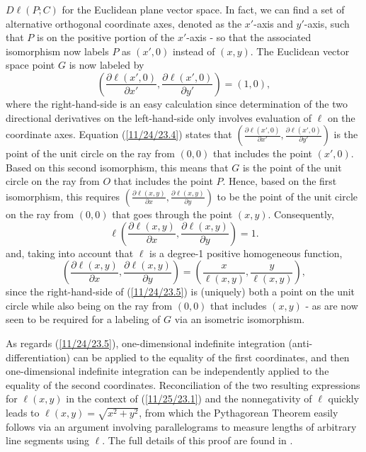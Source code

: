 \documentclass{amsart}
\numberwithin{equation}{section}
\theoremstyle{definition}
\numberwithin{theorem}{section}
\begin{document}
$D\ell(P;C)$ for the Euclidean plane vector space.  In fact, we can find a set of alternative orthogonal coordinate axes, denoted as the $x'$-axis and $y'$-axis, such that $P$ is on the positive portion of the $x'$-axis - so that the associated isomorphism now labels $P$ as $(x',0)$ instead of $(x,y)$.  The Euclidean vector space point $G$ is now labeled by  
 \begin{equation}\label{11/24/23.4} \left( \frac{\partial \ell(x',0)}{\partial x'}, \frac{\partial \ell(x',0)}{\partial y'}\right) = (1,0),\end{equation} where the right-hand-side is an easy calculation since determination of the two directional derivatives on the left-hand-side only involves evaluation of $\ell$ on the coordinate axes.  Equation (\ref{11/24/23.4}) states that $ \left( \frac{\partial \ell(x',0)}{\partial x'}, \frac{\partial \ell(x',0)}{\partial y'}\right)$ is the point of the unit circle on the ray from $(0,0)$ that includes the point $(x',0)$.
 Based on this second isomorphism, this means that $G$ is the point of the unit circle on the ray from $O$ that includes the point $P$.  Hence, based on the first isomorphism, this requires $\left( \frac{\partial \ell(x,y)}{\partial x}, \frac{\partial \ell(x,y)}{\partial y}\right)$ to be the point of the unit circle on the ray from $(0,0)$ that goes through the point $(x,y)$. Consequently, \begin{equation}\label{11/25/23.1} \ell\left( \frac{\partial \ell(x,y)}{\partial x}, \frac{\partial \ell(x,y)}{\partial y}\right) = 1.\end{equation} and, taking into account that $\ell$ is a degree-1 positive homogeneous function,  \begin{equation}\label{11/24/23.5} \left( \frac{\partial \ell(x,y)}{\partial x}, \frac{\partial \ell(x,y)}{\partial y}\right) = \left( \frac{x}{\ell(x,y)},  \frac{y}{\ell(x,y)}\right),\end{equation} since the right-hand-side of (\ref{11/24/23.5}) is (uniquely) both a point on the unit circle while also being on the ray from $(0,0)$ that includes $(x,y)$ - as are now seen to be required for a labeling of $G$ via an isometric isomorphism. 
 
  As regards (\ref{11/24/23.5}), one-dimensional indefinite integration (anti-differentiation) can be applied to the equality of the first coordinates, and then one-dimensional indefinite integration can be independently applied to the equality of the second coordinates.  Reconciliation of the  two resulting expressions for $\ell(x,y)$ in the context of (\ref{11/25/23.1}) and the nonnegativity of $\ell$ quickly leads to $\ell(x,y)=\sqrt{x^2+y^2}$, from which the Pythagorean Theorem easily follows via an argument involving parallelograms to measure lengths of arbitrary line segments using $\ell$. 
   The full details of this proof are found in \cite{fgreensite:2022b}.
\end{document}

